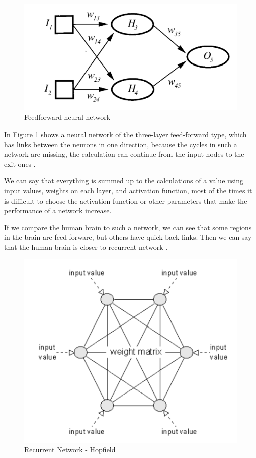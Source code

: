 \begin{figure}[htbp]
	\centerline{\includegraphics[scale=0.75]{fig/neuronal-network.png}}  
  \caption{Feedforward neural network  \cite{book.neuronal.network.1995}}
  \label{fig:feedforward}
\end{figure}

In Figure \ref{fig:feedforward} shows a neural network of the three-layer feed-forward type, which has links between the neurons in one direction,
because the cycles in such a network are missing, 
the calculation can continue from the input nodes to the exit ones \cite{book.neuronal.network.1995}.

We can say that everything is summed up to the calculations of a value using input values, weights on each layer,
and activation function, most of the times it is difficult to choose the activation function or other parameters that make the performance of a network increase.

If we compare the human brain to such a network, we can see that some regions in the brain are feed-forware, but others have quick back links. 
Then we can say that the human brain is closer to recurrent network \cite{book.neuronal.network.1995}.

\begin{figure}[htbp]
	\centerline{\includegraphics[scale=0.75]{fig/reatea-recurenta.png}}  
  \caption{Recurrent Network - Hopfield  \cite{book.neuronal.network.1995}}
  \label{fig:hopfield}
  
\end{figure}

